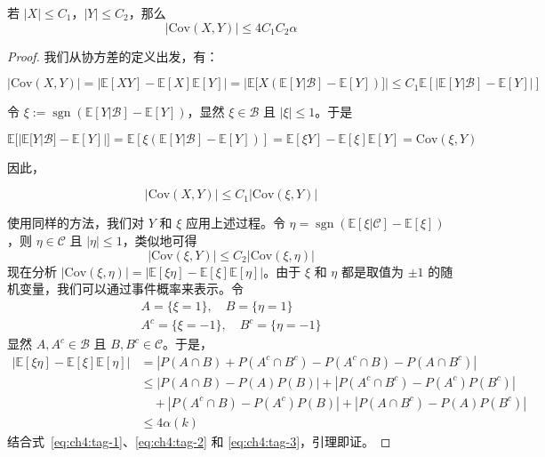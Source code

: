 \begin{lemma}\label{lem:ch4:billingsley}

若 $|X| \leq C_1$，$|Y| \leq C_2$，那么
\[|\mathrm{Cov}(X, Y)| \leq 4C_1C_2\alpha\]
\end{lemma}

\begin{proof}

我们从协方差的定义出发，有：

\begin{equation}
\label{eq:ch4:tag-1}
|\mathrm{Cov}(X, Y)| = |\mathbb{E}[XY] -\mathbb{E}[X]\mathbb{E}[Y]| = \left|\mathbb{E}\Big[X\left(\mathbb{E}[Y|\mathcal{B}] - \mathbb{E}[Y]\right)\Big]\right|\leq C_1 \mathbb{E}\left[\Big|\mathbb{E}[Y|\mathcal{B}] - \mathbb{E}[Y]\Big|\right]
\end{equation}

令 $\xi := \operatorname{sgn}(\mathbb{E}[Y|\mathcal{B}] - \mathbb{E}[Y])$，显然 $\xi \in \mathcal{B}$ 且 $|\xi| \leq 1$。于是

\begin{equation}
\label{eq:ch4:tag-2}
\mathbb{E}\big[|\mathbb{E}[Y|\mathcal{B}] - \mathbb{E}[Y]| \big]= \mathbb{E}\left[\xi \left(\mathbb{E}[Y|\mathcal{B}] - \mathbb{E}[Y]\right)\right] = \mathbb{E}[\xi Y] - \mathbb{E}[\xi]\mathbb{E}[Y] = \mathrm{Cov}(\xi, Y)
\end{equation}

因此，

\begin{equation}
\label{eq:ch4:tag-3}
|\mathrm{Cov}(X, Y)| \leq C_1 |\mathrm{Cov}(\xi, Y)|
\end{equation}

使用同样的方法，我们对 $Y$ 和 $\xi$ 应用上述过程。令 $\eta = \operatorname{sgn}(\mathbb{E}[\xi|\mathcal{C}] - \mathbb{E}[\xi])$，则 $\eta \in \mathcal{C}$ 且 $|\eta| \leq 1$，类似地可得
\[|\mathrm{Cov}(\xi, Y)| \leq C_2 |\mathrm{Cov}(\xi, \eta)|\]
现在分析 $|\mathrm{Cov}(\xi, \eta)| = |\mathbb{E}[\xi\eta] - \mathbb{E}[\xi]\mathbb{E}[\eta]|$。由于 $\xi$ 和 $\eta$ 都是取值为 $\pm 1$ 的随机变量，我们可以通过事件概率来表示。令
\[\begin{gathered}A = \{\xi = 1\}, \quad B = \{\eta = 1\}\\ A^c = \{\xi = -1\}, \quad B^c = \{\eta = -1\} \end{gathered}\]
显然 $A, A^c \in \mathcal{B}$ 且 $B, B^c \in \mathcal{C}$。于是，
\[\begin{aligned} |\mathbb{E}[\xi\eta] - \mathbb{E}[\xi]\mathbb{E}[\eta]| &= |P(A \cap B) + P(A^c \cap B^c) - P(A^c \cap B) - P(A \cap B^c)| \\ &\leq |P(A \cap B) - P(A)P(B)| + |P(A^c \cap B^c) - P(A^c)P(B^c)| \\ &\quad + |P(A^c \cap B) - P(A^c)P(B)| + |P(A \cap B^c) - P(A)P(B^c)| \\ &\leq 4\alpha(k)  \end{aligned}\]
结合式~\eqref{eq:ch4:tag-1}、\eqref{eq:ch4:tag-2} 和 \eqref{eq:ch4:tag-3}，引理即证。

\end{proof}

